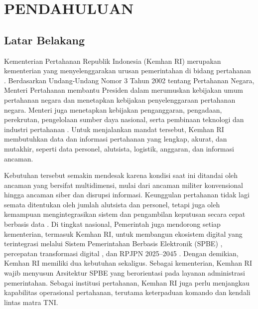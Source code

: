 \cleardoublepage
\chapter{PENDAHULUAN}
\label{chap:I}

\section{Latar Belakang}
\label{sec:I.1}

Kementerian Pertahanan Republik Indonesia (Kemhan RI) merupakan kementerian yang menyelenggarakan urusan pemerintahan di bidang pertahanan \cite{Permenhan13Tahun2026}. Berdasarkan Undang-Undang Nomor 3 Tahun 2002 tentang Pertahanan Negara, Menteri Pertahanan membantu Presiden dalam merumuskan kebijakan umum pertahanan negara dan menetapkan kebijakan penyelenggaraan pertahanan negara. Menteri juga menetapkan kebijakan penganggaran, pengadaan, perekrutan, pengelolaan sumber daya nasional, serta pembinaan teknologi dan industri pertahanan \cite{UU3Tahun2002}. Untuk menjalankan mandat tersebut, Kemhan RI membutuhkan data dan informasi pertahanan yang lengkap, akurat, dan mutakhir, seperti data personel, alutsista, logistik, anggaran, dan informasi ancaman.

Kebutuhan tersebut semakin mendesak karena kondisi saat ini ditandai oleh ancaman yang bersifat multidimensi, mulai dari ancaman militer konvensional hingga ancaman siber dan disrupsi informasi. Keunggulan pertahanan tidak lagi semata ditentukan oleh jumlah alutsista dan personel, tetapi juga oleh kemampuan mengintegrasikan sistem dan pengambilan keputusan secara cepat berbasis data \cite{USDoD2019,Koch2015,USDoD2022}. Di tingkat nasional, Pemerintah juga mendorong setiap kementerian, termasuk Kemhan RI, untuk membangun ekosistem digital yang terintegrasi melalui Sistem Pemerintahan Berbasis Elektronik (SPBE) \cite{Perpres95Tahun2018}, percepatan transformasi digital \cite{Perpres82Tahun2023}, dan RPJPN 2025–2045 \cite{UU59Tahun2024}. Dengan demikian, Kemhan RI memiliki dua kebutuhan sekaligus. Sebagai kementerian, Kemhan RI wajib menyusun Arsitektur SPBE yang berorientasi pada layanan administrasi pemerintahan. Sebagai institusi pertahanan, Kemhan RI juga perlu menjangkau kapabilitas operasional pertahanan, terutama keterpaduan komando dan kendali lintas matra TNI.

